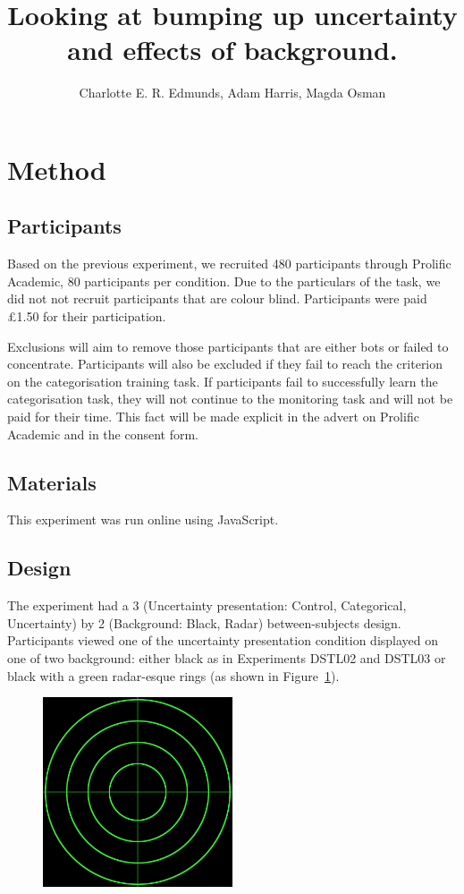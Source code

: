 \documentclass[doc, a4paper, apacite]{apa6}
\title{Looking at bumping up uncertainty and effects of background.}
\author{Charlotte E. R. Edmunds, Adam Harris, Magda Osman}
\affiliation{Queen Mary, UCL, University of London \\ 26 November 2020}
\begin{document}
\maketitle
\doublespacing

\section{Method}
\subsection{Participants}
Based on the previous experiment, we recruited 480 participants through Prolific Academic, 80 participants per condition. 
Due to the particulars of the task, we did not not recruit participants that are colour blind. 
Participants were paid \pounds1.50 for their participation. 

Exclusions will aim to remove those participants that are either bots or failed to concentrate. 
Participants will also be excluded if they fail to reach the criterion on the categorisation training task. 
If participants fail to successfully learn the categorisation task, they will not continue to the monitoring task and will not be paid for their time. 
This fact will be made explicit in the advert on Prolific Academic and in the consent form. 

\subsection{Materials}
This experiment was run online using JavaScript. 

\subsection{Design}
The experiment had a 3 (Uncertainty presentation: Control, Categorical, Uncertainty) by 2 (Background: Black, Radar) between-subjects design. 
Participants viewed one of the uncertainty presentation condition displayed on one of two background: either black as in Experiments DSTL02 and DSTL03 or black with a green radar-esque rings (as shown in Figure~\ref{fig:radar}). 

\begin{figure}
	\centering
	\includegraphics[width=0.5\textwidth]{images/radar.jpg}
	\caption{}
	\label{fig:radar}
\end{figure}
\end{document}
